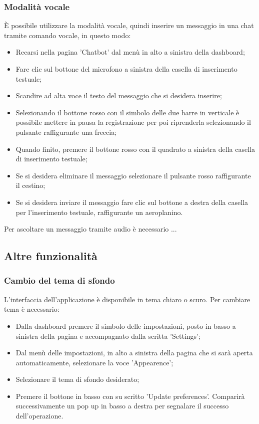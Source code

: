 \documentclass[10pt, a4paper]{article}
\begin{document}
\subsubsection{Modalità vocale}
È possibile utilizzare la modalità vocale, quindi inserire un messaggio in una chat tramite comando vocale, in questo modo:
\begin{itemize}
    \item Recarsi nella pagina 'Chatbot' dal menù in alto a sinistra della dashboard;
    \item Fare clic sul bottone del microfono a sinistra della casella di inserimento testuale;
    \item Scandire ad alta voce il testo del messaggio che si desidera inserire;
    \item Selezionando il bottone rosso con il simbolo delle due barre in verticale è possibile mettere in pausa la registrazione per poi riprenderla selezionando il pulsante raffigurante una freccia;
    \item Quando finito, premere il bottone rosso con il quadrato a sinistra della casella di inserimento testuale;
    \item Se si desidera eliminare il messaggio selezionare il pulsante rosso raffigurante il cestino;
    \item Se si desidera inviare il messaggio fare clic sul bottone a destra della casella per l'inserimento testuale, raffigurante un aeroplanino.
\end{itemize}
Per ascoltare un messaggio tramite audio è necessario ...

\subsection{Altre funzionalità}
\subsubsection{Cambio del tema di sfondo}
L'interfaccia dell'applicazione è disponibile in tema chiaro o scuro. Per cambiare tema è necessario:
\begin{itemize}
    \item Dalla dashboard premere il simbolo delle impostazioni, posto in basso a sinistra della pagina e accompagnato dalla scritta 'Settings';
    \item Dal menù delle impostazioni, in alto a sinistra della pagina che si sarà aperta automaticamente, selezionare la voce 'Appearence';
    \item Selezionare il tema di sfondo desiderato;
    \item Premere il bottone in basso con su scritto 'Update preferences'. Comparirà successivamente un pop up in basso a destra per segnalare il successo dell'operazione.
\end{itemize}
\end{document}
